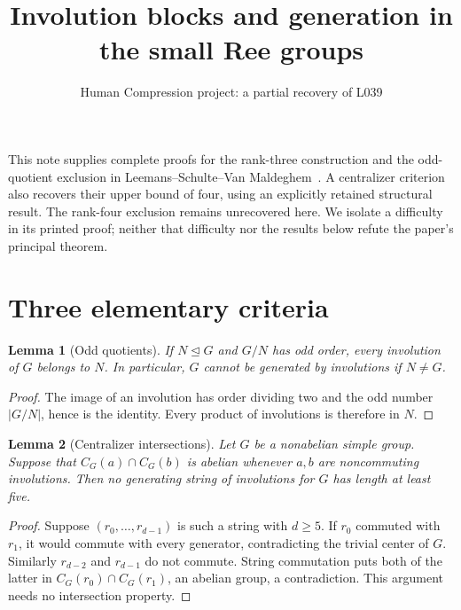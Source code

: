 \documentclass[11pt,a4paper]{article}
\title{Involution blocks and generation in the small Ree groups}
\author{Human Compression project: a partial recovery of L039}
\date{}
\newtheorem{lemma}{Lemma}
\begin{document}
\maketitle
This note supplies complete proofs for the rank-three construction and the
odd-quotient exclusion in Leemans--Schulte--Van Maldeghem~\cite{LSV}.
A centralizer criterion also recovers their upper bound of four, using an
explicitly retained structural result. The rank-four exclusion remains
unrecovered here. We isolate a difficulty in its printed proof; neither that
difficulty nor the results below refute the paper's principal theorem.

\section{Three elementary criteria}
\begin{lemma}[Odd quotients]
If $N\trianglelefteq G$ and $G/N$ has odd order, every involution of $G$
belongs to $N$. In particular, $G$ cannot be generated by involutions if
$N\ne G$.
\end{lemma}
\begin{proof}
The image of an involution has order dividing two and the odd number
$|G/N|$, hence is the identity. Every product of involutions is therefore
in $N$.
\end{proof}

\begin{lemma}[Centralizer intersections]\label{central}
Let $G$ be a nonabelian simple group. Suppose that $C_G(a)\cap C_G(b)$
is abelian whenever $a,b$ are noncommuting involutions. Then no generating
string of involutions for $G$ has length at least five.
\end{lemma}
\begin{proof}
Suppose $(r_0,\ldots,r_{d-1})$ is such a string with $d\ge5$.
If $r_0$ commuted with $r_1$, it would commute with every generator,
contradicting the trivial center of $G$. Similarly $r_{d-2}$ and
$r_{d-1}$ do not commute. String commutation puts both of the latter
in $C_G(r_0)\cap C_G(r_1)$, an abelian group, a contradiction.
This argument needs no intersection property.
\end{proof}
\end{document}
